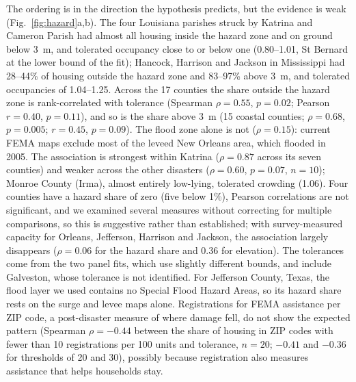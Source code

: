 \documentclass[11pt]{article}
\begin{document}
The ordering is in the direction the hypothesis predicts, but the evidence is weak (Fig.~\ref{fig:hazard}a,b). The four Louisiana parishes struck by Katrina and Cameron Parish had almost all housing inside the hazard zone and on ground below 3~m, and tolerated occupancy close to or below one (0.80--1.01, St Bernard at the lower bound of the fit); Hancock, Harrison and Jackson in Mississippi had 28--44\% of housing outside the hazard zone and 83--97\% above 3~m, and tolerated occupancies of 1.04--1.25. Across the 17 counties the share outside the hazard zone is rank-correlated with tolerance (Spearman $\rho=0.55$, $p=0.02$; Pearson $r=0.40$, $p=0.11$), and so is the share above 3~m (15 coastal counties; $\rho=0.68$, $p=0.005$; $r=0.45$, $p=0.09$). The flood zone alone is not ($\rho=0.15$): current FEMA maps exclude most of the leveed New Orleans area, which flooded in 2005. The association is strongest within Katrina ($\rho=0.87$ across its seven counties) and weaker across the other disasters ($\rho=0.60$, $p=0.07$, $n=10$); Monroe County (Irma), almost entirely low-lying, tolerated crowding (1.06). Four counties have a hazard share of zero (five below 1\%), Pearson correlations are not significant, and we examined several measures without correcting for multiple comparisons, so this is suggestive rather than established; with survey-measured capacity for Orleans, Jefferson, Harrison and Jackson, the association largely disappears ($\rho=0.06$ for the hazard share and 0.36 for elevation). The tolerances come from the two panel fits, which use slightly different bounds, and include Galveston, whose tolerance is not identified. For Jefferson County, Texas, the flood layer we used contains no Special Flood Hazard Areas, so its hazard share rests on the surge and levee maps alone. Registrations for FEMA assistance per ZIP code, a post-disaster measure of where damage fell, do not show the expected pattern (Spearman $\rho=-0.44$ between the share of housing in ZIP codes with fewer than 10 registrations per 100 units and tolerance, $n=20$; $-0.41$ and $-0.36$ for thresholds of 20 and 30), possibly because registration also measures assistance that helps households stay.
\end{document}
